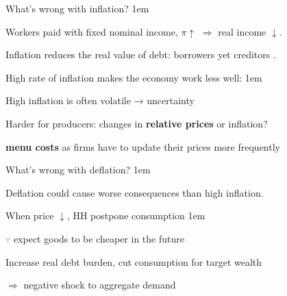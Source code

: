 \documentclass[11pt,aspectratio=43,usenames,dvipsnames]{beamer}
\let\olditemize=\itemize
\let\endolditemize=\enditemize
\renewenvironment{itemize}{\olditemize \itemsep1em}{\endolditemize}
\theoremstyle{definition}
\begin{document}
\begin{frame}{What's wrong with inflation?}
\label{slide:What_s_wrong_with_inflation_}
    \begin{itemize}
        \item Workers paid with fixed nominal income, $ \pi \uparrow  $ $ \Rightarrow  $ real income $ \downarrow  $.
        \item Inflation \alert{reduces the real} value of debt: borrowers \faSmileO \hspace{2pt} yet creditors \faFrownO .
        \item High rate of inflation makes the economy work less well:
        \begin{itemize}
            \item High inflation is often volatile → uncertainty
            \item Harder for producers: changes in \textbf{relative prices} or inflation?
            \item \textbf{menu costs} as firms have to update their prices more frequently
        \end{itemize}

    \end{itemize}

\end{frame}

\begin{frame}{What's wrong with deflation?}
\label{slide:What_s_wrong_with_deflation_}
    \begin{itemize}
        \item Deflation could cause worse consequences than high inflation.
        \item When price $ \downarrow  $, HH postpone consumption
        \begin{itemize}
            \item $ \because $ \alert{expect} goods to be cheaper in the future
            \item \alert{Increase} real debt burden, cut consumption for target wealth
        \end{itemize}
        \item $ \Rightarrow  $ negative shock to aggregate demand
    \end{itemize}
\end{frame}
\end{document}

